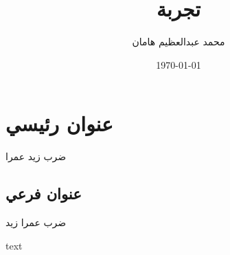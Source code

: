 \documentclass[11pt]{article}
\title{تجربة}
\author{محمد عبدالعظيم هامان}
\date{\today}
\begin{document}
\maketitle
\section{عنوان
رئيسي}\label{ux639ux646ux648ux627ux646-ux631ux626ux64aux633ux64a}

ضرب زيد عمرا

\subsection{عنوان
فرعي}\label{ux639ux646ux648ux627ux646-ux641ux631ux639ux64a}

ضرب عمرا زيد

\begin{english}
     text
\end{english}
\end{document}
